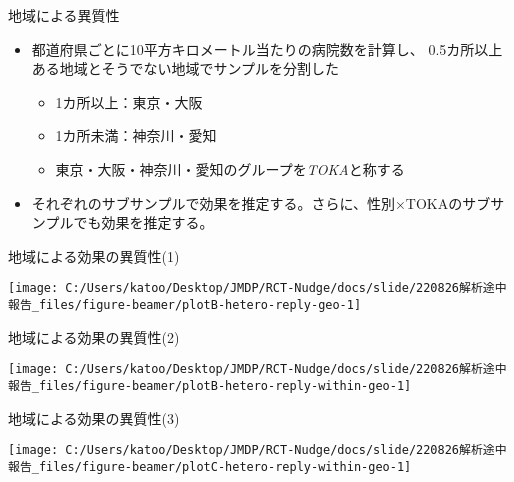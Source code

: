 \documentclass[
      aspectratio=169,
        12pt,
    ]{beamer}
\providecommand{\tightlist}{%
  \setlength{\itemsep}{0pt}\setlength{\parskip}{0pt}}
\begin{document}
\begin{frame}{地域による異質性}
\protect\hypertarget{ux5730ux57dfux306bux3088ux308bux7570ux8ceaux6027}{}
\begin{itemize}
\tightlist
\item
  都道府県ごとに10平方キロメートル当たりの病院数を計算し、
  0.5カ所以上ある地域とそうでない地域でサンプルを分割した

  \begin{itemize}
  \tightlist
  \item
    1カ所以上：東京・大阪
  \item
    1カ所未満：神奈川・愛知
  \item
    東京・大阪・神奈川・愛知のグループを\emph{TOKA}と称する
  \end{itemize}
\item
  それぞれのサブサンプルで効果を推定する。さらに、性別×TOKAのサブサンプルでも効果を推定する。
\end{itemize}
\end{frame}

\begin{frame}{地域による効果の異質性(1)}
\protect\hypertarget{ux5730ux57dfux306bux3088ux308bux52b9ux679cux306eux7570ux8ceaux60271}{}
\begin{center}\texttt{[image: C:/Users/katoo/Desktop/JMDP/RCT-Nudge/docs/slide/220826解析途中報告\_files/figure-beamer/plotB-hetero-reply-geo-1]} \end{center}
\end{frame}

\begin{frame}{地域による効果の異質性(2)}
\protect\hypertarget{ux5730ux57dfux306bux3088ux308bux52b9ux679cux306eux7570ux8ceaux60272}{}
\begin{center}\texttt{[image: C:/Users/katoo/Desktop/JMDP/RCT-Nudge/docs/slide/220826解析途中報告\_files/figure-beamer/plotB-hetero-reply-within-geo-1]} \end{center}
\end{frame}

\begin{frame}{地域による効果の異質性(3)}
\protect\hypertarget{ux5730ux57dfux306bux3088ux308bux52b9ux679cux306eux7570ux8ceaux60273}{}
\begin{center}\texttt{[image: C:/Users/katoo/Desktop/JMDP/RCT-Nudge/docs/slide/220826解析途中報告\_files/figure-beamer/plotC-hetero-reply-within-geo-1]} \end{center}
\end{frame}
\end{document}
